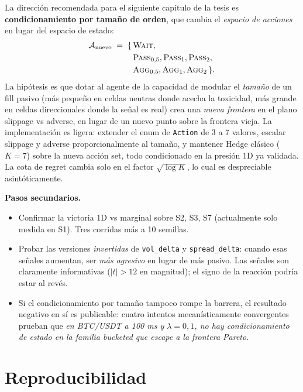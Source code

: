 \documentclass[journal,onecolumn,11pt]{IEEEtran}
\begin{document}
La dirección recomendada para el siguiente capítulo de la tesis es
\textbf{condicionamiento por tamaño de orden}, que cambia el
\emph{espacio de acciones} en lugar del espacio de estado:
\begin{align}
\mathcal{A}_{\text{nuevo}} \;=\; \{\, &\textsc{Wait},\notag\\
                                   &\textsc{Pass}_{0{,}5},\textsc{Pass}_{1},\textsc{Pass}_{2},\notag\\
                                   &\textsc{Agg}_{0{,}5},\textsc{Agg}_{1},\textsc{Agg}_{2}\,\}.
\end{align}
La hipótesis es que dotar al agente de la capacidad de modular el
\emph{tamaño} de un fill pasivo (más pequeño en celdas neutras donde
acecha la toxicidad, más grande en celdas direccionales donde la
señal es real) crea una \emph{nueva frontera} en el plano slippage
vs adverse, en lugar de un nuevo punto sobre la frontera vieja.
La implementación es ligera: extender el enum de \texttt{Action} de 3
a 7 valores, escalar slippage y adverse proporcionalmente al tamaño,
y mantener Hedge clásico ($K\!=\!7$) sobre la nueva acción set, todo
condicionado en la presión 1D ya validada. La cota de regret cambia
solo en el factor $\sqrt{\log K}$, lo cual es despreciable
asintóticamente.

\medskip

\noindent
\textbf{Pasos secundarios.}
\begin{itemize}
\item Confirmar la victoria 1D vs marginal sobre S2, S3, S7
      (actualmente solo medida en S1). Tres corridas más a 10 semillas.
\item Probar las versiones \emph{invertidas} de \texttt{vol\_delta}
      y \texttt{spread\_delta}: cuando esas señales aumentan, ser
      \emph{más agresivo} en lugar de más pasivo. Las señales son
      claramente informativas ($|t|>12$ en magnitud); el signo de la
      reacción podría estar al revés.
\item Si el condicionamiento por tamaño tampoco rompe la barrera, el
      resultado negativo en sí es publicable: cuatro intentos
      mecanísticamente convergentes prueban que \emph{en BTC/USDT a
      100 ms y $\lambda=0{,}1$, no hay condicionamiento de estado
      en la familia bucketed que escape a la frontera Pareto}.
\end{itemize}

\section*{Reproducibilidad}
\end{document}
